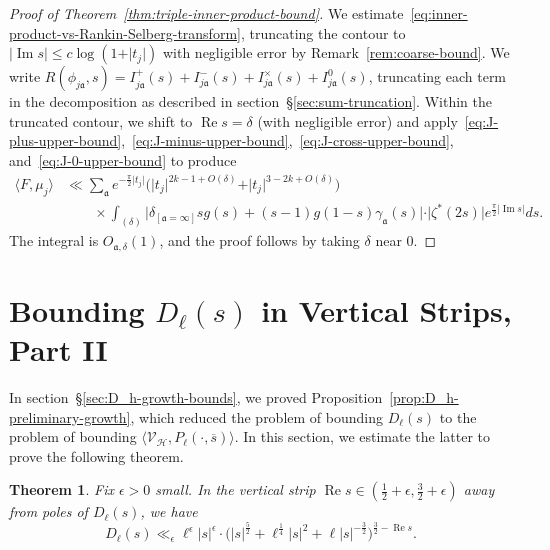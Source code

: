 \documentclass[11pt,reqno]{amsart}
\theoremstyle{plain}
\newtheorem{theorem}{Theorem}[section]
\theoremstyle{definition}
\numberwithin{equation}{section}
\renewcommand{\Im}{\operatorname{Im}}
\renewcommand{\Re}{\operatorname{Re}}
\begin{document}
\begin{proof}[Proof of Theorem~\ref{thm:triple-inner-product-bound}]
We estimate~\eqref{eq:inner-product-vs-Rankin-Selberg-transform}, truncating the contour to $\vert \Im s \vert \leq c \log(1+ \vert t_j \vert)$ with negligible error by Remark~\ref{rem:coarse-bound}. We write $R(\phi_{j\mathfrak{a}},s) = I_{j\mathfrak{a}}^+(s) + I_{j\mathfrak{a}}^-(s) + I_{j\mathfrak{a}}^\times(s) + I_{j\mathfrak{a}}^0(s)$, truncating each term in the decomposition as described in section~\S{\ref{sec:sum-truncation}}. Within the truncated contour, we shift to $\Re s = \delta$ (with negligible error) and apply~\eqref{eq:J-plus-upper-bound},~\eqref{eq:J-minus-upper-bound},~\eqref{eq:J-cross-upper-bound}, and~\eqref{eq:J-0-upper-bound} to produce
\begin{align*}
	\langle F, \mu_j \rangle
	& \ll \sum_{\mathfrak{a}} e^{-\frac{\pi}{2} \vert t_j \vert} 
	\big( \vert t_j \vert^{2k-1+O(\delta)} + \vert t_j \vert^{3-2k+O(\delta)} \big) \\
	& \qquad \times \int_{(\delta)} 
			\big\vert \delta_{[\mathfrak{a}=\infty]}s g(s) + (s-1) g(1-s) \gamma_\mathfrak{a}(s)\big\vert 
			\cdot \vert \zeta^*(2s) \vert e^{\frac{\pi}{2} \vert \Im s \vert} ds.
\end{align*}
The integral is $O_{\mathfrak{a},\delta}(1)$, and the proof follows by taking $\delta$ near $0$.
\end{proof}


\section{Bounding \texorpdfstring{$D_\ell(s)$}{Dh(s)} in Vertical Strips, Part II} \label{sec:D_h-growth-II}

In section~\S{\ref{sec:D_h-growth-bounds}}, we proved Proposition~\ref{prop:D_h-preliminary-growth}, which reduced the problem of bounding $D_\ell(s)$ to the problem of bounding $\langle \mathcal{V}_\mathcal{H}, P_\ell(\cdot, \overline{s}) \rangle$. In this section, we estimate the latter to prove the following theorem.

\begin{theorem} \label{thm:D_h-growth}
Fix $\epsilon > 0$ small. In the vertical strip $\Re s \in (\frac{1}{2}+\epsilon,\frac{3}{2}+\epsilon)$ away from poles of $D_\ell(s)$, we have
\[
	D_\ell(s) 
	\ll_{\epsilon} \ell^\epsilon \vert s \vert^\epsilon \cdot
	\big(\vert s \vert^{\frac{5}{2}} + \ell^{\frac{1}{4}} \vert s \vert^{2}
		+ \ell \vert s \vert^{-\frac{3}{2}} \big)^{\frac{3}{2} - \Re s}.
\]
\end{theorem}
\end{document}
